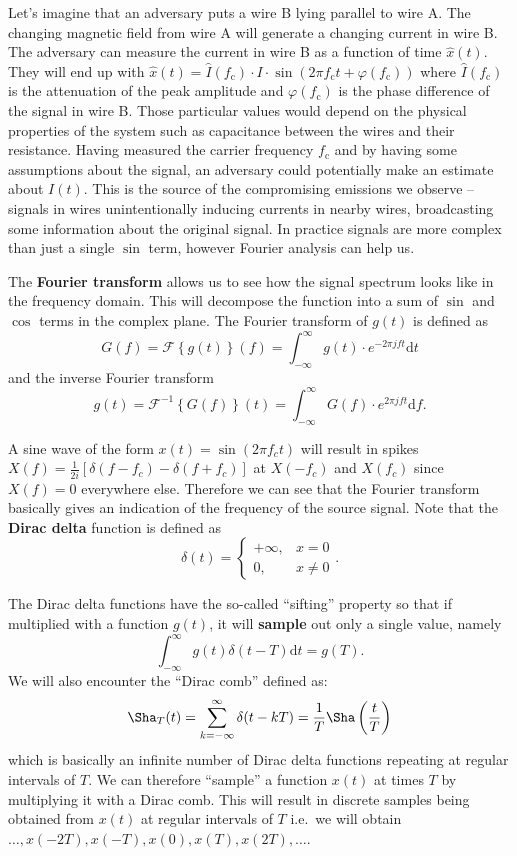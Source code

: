 \documentclass[a4paper,12pt,twoside,openright]{report}
\begin{document}
Let's imagine that an adversary puts a wire B lying parallel to wire A. The changing magnetic field from wire A will generate a changing current in wire B. The adversary can measure the current in wire B as a function of time $\hat{x}(t)$. They will end up with $\hat{x}(t) = \hat{I}(f_\text{c}) \cdot I  \cdot \sin( 2\pi f_\text{c} t + \varphi(f_\text{c}))$ where $\hat{I}(f_\text{c})$ is the attenuation of the peak amplitude and $\varphi( f_\text{c})$ is the phase difference of the signal in wire B. Those particular values would depend on the physical properties of the system such as capacitance between the wires and their resistance. Having measured the carrier frequency $f_\text{c}$ and by having some assumptions about the signal, an adversary could potentially make an estimate about $I(t)$. This is the source of the compromising emissions we observe -- signals in wires unintentionally inducing currents in nearby wires, broadcasting some information about the original signal. In practice signals are more complex than just a single $\sin$ term, however Fourier analysis can help us.

The \textbf{Fourier transform} \cite{briggs1995dft} allows us to see how the signal spectrum looks like in the frequency domain. This will decompose the function into a sum of $\sin$ and $\cos$ terms in the complex plane. The Fourier transform of $g(t)$ is defined as
$$G(f)=\mathcal{F} \left\{ g(t) \right\} (f) = \int_{-\infty}^{\infty} g(t) \cdot e^{- 2 \pi j f t} \text{d} t $$
and the inverse Fourier transform
$$g(t) = \mathcal{F}^{-1} \left\{ G(f) \right\} (t) = \int_{-\infty}^{\infty} G(f) \cdot e^{2 \pi j f t} \text{d} f.$$

A sine wave of the form $x(t) = \sin(2 \pi f_{c} t)$ will result in spikes $X(f) = \frac{1}{2 i} [\delta(f - f_{c}) - \delta(f
 + f_{c})]$ at $X(-f_{c})$ and $X(f_{c})$ since $X(f) = 0$ everywhere else. Therefore we can see that the Fourier transform basically gives an indication of the frequency of the source signal. Note that the \textbf{Dirac delta} function is defined as
$$ \delta(t) = \begin{cases} +\infty, & x = 0 \\ 0, & x \neq 0 \end{cases}.$$

The Dirac delta functions have the so-called ``sifting'' property so that if multiplied with a function $g(t)$, it will \textbf{sample} out only a single value, namely
$$ \int_{-\infty}^{\infty} g(t) \delta(t - T) \text{d} t = g(T) .$$
We will also encounter the ``Dirac comb'' defined as:
$$ \Sha_{T}(t) = \sum_{k=-\infty}^{\infty} \delta(t - kT) = \frac{1}{T} \Sha \left( \frac{t}{T} \right) $$
which is basically an infinite number of Dirac delta functions repeating at regular intervals of $T$. We can therefore ``sample'' a function $x(t)$ at times $T$ by multiplying it with a Dirac comb. This will result in discrete samples being obtained from $x(t)$ at regular intervals of $T$ i.e.\  we will obtain $\dots, x(-2 T), x(-T), x(0), x(T), x(2 T), \dots$.
\end{document}
